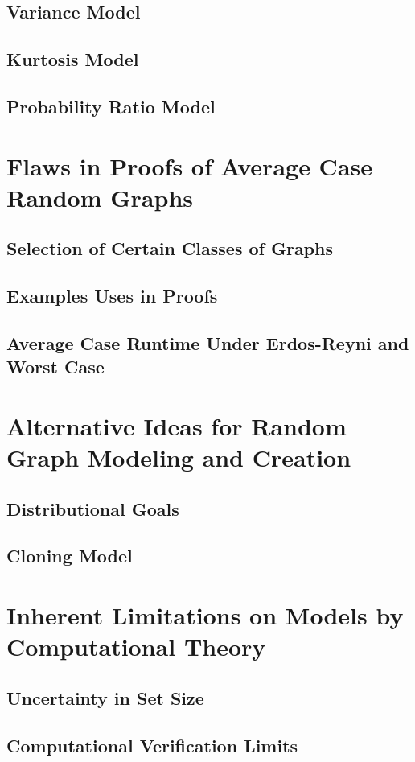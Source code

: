 \documentclass[11pt,a4paper]{report}
\begin{document}
\subsection{Variance Model}
\subsection{Kurtosis Model}
\subsection{Probability Ratio Model}

\section{Flaws in Proofs of Average Case Random Graphs}
\subsection{Selection of Certain Classes of Graphs}
\subsection{Examples Uses in Proofs}
\subsection{Average Case Runtime Under Erdos-Reyni and Worst Case}

\section{Alternative Ideas for Random Graph Modeling and Creation}
\subsection{Distributional Goals}
\subsection{Cloning Model}

\section{Inherent Limitations on Models by Computational Theory}
\subsection{Uncertainty in Set Size}
\subsection{Computational Verification Limits}
\end{document}
